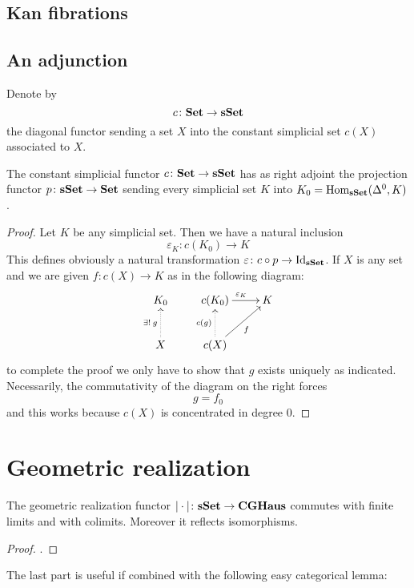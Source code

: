 \begin{refsection}
\subsection{Kan fibrations}

\subsection{An adjunction}

Denote by
\[
c \colon \mathbf{Set} \to \mathbf{sSet}
\]
the diagonal functor sending a set $X$ into the constant simplicial set $c(X)$ associated to $X$.

\begin{lemma} \label{lemma set sset adjoints}
The constant simplicial functor $c \colon \mathbf{Set} \to \mathbf{sSet}$ has as right adjoint the projection functor $p \colon \mathbf{sSet} \to \mathbf{Set}$ sending every simplicial set $K$ into $K_0 = \mathrm{Hom}_{\mathbf{sSet}}(\Delta^0,K)$.
\end{lemma}

\begin{proof}
Let $K$ be any simplicial set. Then we have a natural inclusion
\[
\varepsilon_K \colon c(K_0) \to K
\]
This defines obviously a natural transformation $\varepsilon \colon c \circ p \to \mathrm{Id}_{\mathbf{sSet}}$. If $X$ is any set and we are given $f \colon c(X) \to K$ as in the following diagram:
\[
\xymatrix{
K_0 & c(K_0) \ar[r]^{\varepsilon_K} & K \\ X \ar@{.>}[u]^{\exists ! \:g} & c(X) \ar@{.>}[u]^{c(g)} \ar[ur]_f
}
\]
to complete the proof we only have to show that $g$ exists uniquely as indicated. Necessarily, the commutativity of the diagram on the right forces
\[
g = f_0
\]
and this works because $c(X)$ is concentrated in degree 0.
\end{proof}

\section{Geometric realization}

\begin{thm} \label{thm exactness of geometric realization}
The geometric realization functor $| \cdot | \colon \mathbf{sSet} \to \mathbf{CGHaus}$ commutes with finite limits and with colimits. Moreover it reflects isomorphisms.
\end{thm}

\begin{proof}
\cite[Ch. III.3]{gz}.
\end{proof}

The last part is useful if combined with the following easy categorical lemma:


\end{refsection}
